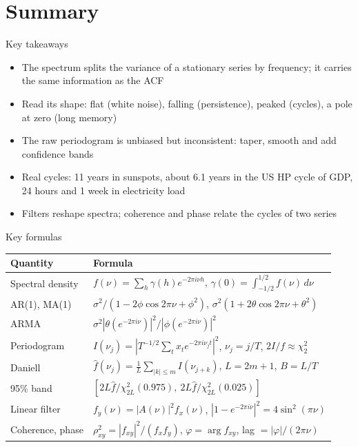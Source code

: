 \section{Summary}

\begin{frame}{Key takeaways}
\itemsize{\small}
\begin{itemize}
    \item The spectrum splits the variance of a stationary series by frequency; it carries the same information as the ACF
    \item Read its shape: flat (white noise), falling (persistence), peaked (cycles), a pole at zero (long memory)
    \item The raw periodogram is unbiased but inconsistent: taper, smooth and add confidence bands
    \item Real cycles: 11 years in sunspots, about 6.1 years in the US HP cycle of GDP, 24 hours and 1 week in electricity load
    \item Filters reshape spectra; coherence and phase relate the cycles of two series
\end{itemize}
\end{frame}

\begin{frame}{Key formulas}
\itemsize{\small}
{\renewcommand{\arraystretch}{1.35}\begin{center}
\footnotesize
\begin{tabular}{ll}
\toprule
\textbf{Quantity} & \textbf{Formula} \\
\midrule
Spectral density & $f(\nu) = \sum_h\gamma(h)e^{-2\pi i\nu h}$, \quad $\gamma(0) = \int_{-1/2}^{1/2} f(\nu)\,d\nu$ \\
AR(1), MA(1) & $\sigma^2/(1 - 2\phi\cos 2\pi\nu + \phi^2)$, \quad $\sigma^2(1 + 2\theta\cos 2\pi\nu + \theta^2)$ \\
ARMA & $\sigma^2|\theta(e^{-2\pi i\nu})|^2/|\phi(e^{-2\pi i\nu})|^2$ \\
Periodogram & $I(\nu_j) = |T^{-1/2}\sum_t x_t e^{-2\pi i\nu_j t}|^2$, \quad $\nu_j = j/T$, \quad $2I/f \approx \chi^2_2$ \\
Daniell & $\hat f(\nu_j) = \frac1L\sum_{|k| \le m} I(\nu_{j+k})$, \quad $L = 2m + 1$, \quad $B = L/T$ \\
95\% band & $[2L\hat f/\chi^2_{2L}(0.975),\ 2L\hat f/\chi^2_{2L}(0.025)]$ \\
Linear filter & $f_y(\nu) = |A(\nu)|^2 f_x(\nu)$, \quad $|1 - e^{-2\pi i\nu}|^2 = 4\sin^2(\pi\nu)$ \\
Coherence, phase & $\rho^2_{xy} = |f_{xy}|^2/(f_x f_y)$, \quad $\varphi = \arg f_{xy}$, \quad lag $= |\varphi|/(2\pi\nu)$ \\
\bottomrule
\end{tabular}
\end{center}
}
\end{frame}

